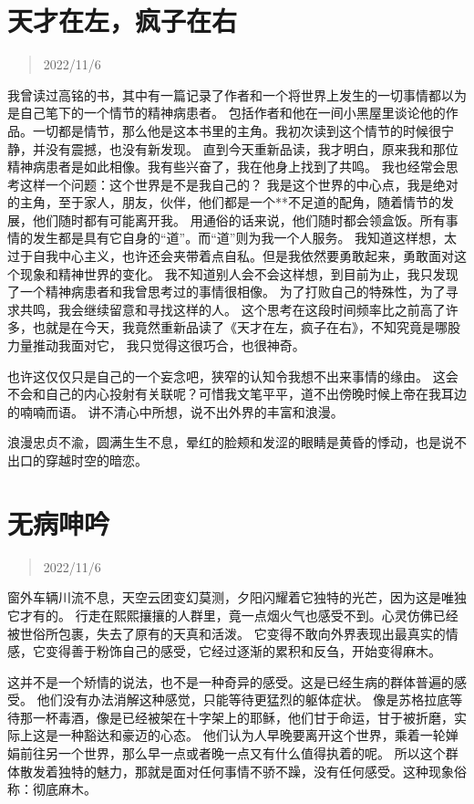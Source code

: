 \documentclass[cn,12pt]{elegantbook}
\begin{document}
\newpage
\section{天才在左，疯子在右}
\begin{quotation}
  2022/11/6
\end{quotation}

我曾读过高铭的书，其中有一篇记录了作者和一个将世界上发生的一切事情都以为是自己笔下的一个情节的精神病患者。
包括作者和他在一间小黑屋里谈论他的作品。一切都是情节，那么他是这本书里的主角。我初次读到这个情节的时候很宁静，并没有震撼，也没有新发现。
直到今天重新品读，我才明白，原来我和那位精神病患者是如此相像。我有些兴奋了，我在他身上找到了共鸣。
我也经常会思考这样一个问题：这个世界是不是我自己的？
我是这个世界的中心点，我是绝对的主角，至于家人，朋友，伙伴，他们都是一个**不足道的配角，随着情节的发展，他们随时都有可能离开我。
用通俗的话来说，他们随时都会领盒饭。所有事情的发生都是具有它自身的“道”。而“道”则为我一个人服务。
我知道这样想，太过于自我中心主义，也许还会夹带着点自私。但是我依然要勇敢起来，勇敢面对这个现象和精神世界的变化。
我不知道别人会不会这样想，到目前为止，我只发现了一个精神病患者和我曾思考过的事情很相像。
为了打败自己的特殊性，为了寻求共鸣，我会继续留意和寻找这样的人。
这个思考在这段时间频率比之前高了许多，也就是在今天，我竟然重新品读了《天才在左，疯子在右》，不知究竟是哪股力量推动我面对它，
我只觉得这很巧合，也很神奇。

也许这仅仅只是自己的一个妄念吧，狭窄的认知令我想不出来事情的缘由。
这会不会和自己的内心投射有关联呢？可惜我文笔平平，道不出傍晚时候上帝在我耳边的喃喃而语。
讲不清心中所想，说不出外界的丰富和浪漫。

浪漫忠贞不渝，圆满生生不息，晕红的脸颊和发涩的眼睛是黄昏的悸动，也是说不出口的穿越时空的暗恋。

\newpage
\section{无病呻吟}
\begin{quotation}
  2022/11/6
\end{quotation}

窗外车辆川流不息，天空云团变幻莫测，夕阳闪耀着它独特的光芒，因为这是唯独它才有的。
行走在熙熙攘攘的人群里，竟一点烟火气也感受不到。心灵仿佛已经被世俗所包裹，失去了原有的天真和活泼。
它变得不敢向外界表现出最真实的情感，它变得善于粉饰自己的感受，它经过逐渐的累积和反刍，开始变得麻木。

这并不是一个矫情的说法，也不是一种奇异的感受。这是已经生病的群体普遍的感受。
他们没有办法消解这种感觉，只能等待更猛烈的躯体症状。
像是苏格拉底等待那一杯毒酒，像是已经被架在十字架上的耶稣，他们甘于命运，甘于被折磨，实际上这是一种豁达和豪迈的心态。
他们认为人早晚要离开这个世界，乘着一轮婵娟前往另一个世界，那么早一点或者晚一点又有什么值得执着的呢。
所以这个群体散发着独特的魅力，那就是面对任何事情不骄不躁，没有任何感受。这种现象俗称：彻底麻木。
\end{document}
